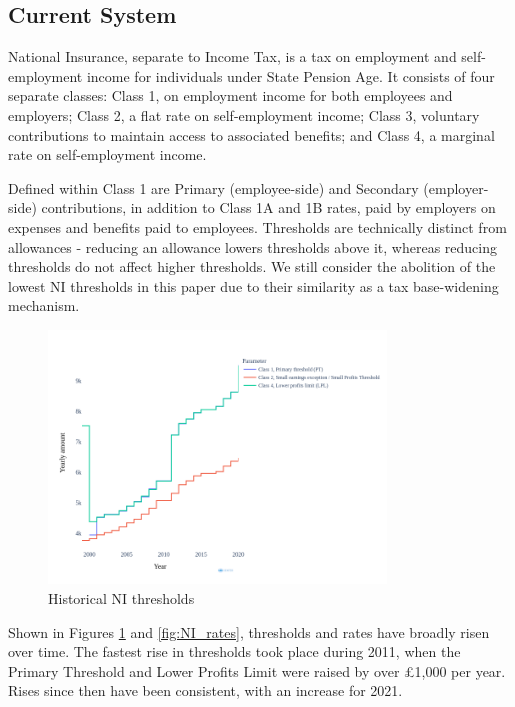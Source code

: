 \documentclass{article}
\begin{document}
    \subsection{Current System}
    National Insurance, separate to Income Tax, is a tax on employment and self-employment income for individuals under State Pension Age. It consists of four separate classes: Class 1, on employment income for both employees and employers; Class 2, a flat rate on self-employment income; Class 3, voluntary contributions to maintain access to associated benefits; and Class 4, a marginal rate on self-employment income.

    Defined within Class 1 are Primary (employee-side) and Secondary (employer-side) contributions, in addition to Class 1A and 1B rates, paid by employers on expenses and benefits paid to employees. Thresholds are technically distinct from allowances - reducing an allowance lowers thresholds above it, whereas reducing thresholds do not affect higher thresholds. We still consider the abolition of the lowest NI thresholds in this paper due to their similarity as a tax base-widening mechanism. 

    \begin{figure}
        \centering
        \includegraphics[width=0.8\textwidth]{images/fig_6.png}
        \caption{Historical NI thresholds}
        \label{fig:NI_thresholds}
    \end{figure}

    Shown in Figures \ref{fig:NI_thresholds} and \ref{fig:NI_rates}, thresholds and rates have broadly risen over time. The fastest rise in thresholds took place during 2011, when the Primary Threshold and Lower Profits Limit were raised by over £1,000 per year. Rises since then have been consistent, with an increase for 2021.
    
\end{document}
